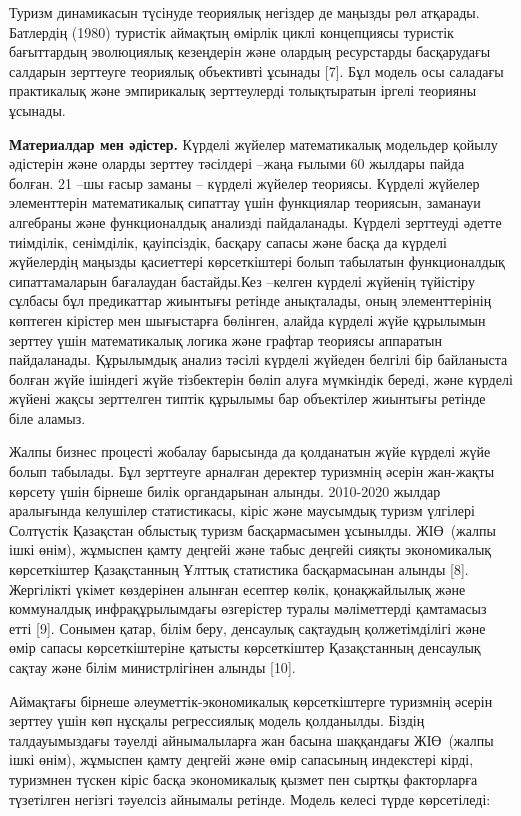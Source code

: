 \begin{multicols}{2}
Туризм динамикасын түсінуде теориялық негіздер де маңызды рөл атқарады.
Батлердің (1980) туристік аймақтың өмірлік циклі концепциясы туристік
бағыттардың эволюциялық кезеңдерін және олардың ресурстарды басқарудағы
салдарын зерттеуге теориялық объективті ұсынады {[}7{]}. Бұл модель осы
саладағы практикалық және эмпирикалық зерттеулерді толықтыратын іргелі
теорияны ұсынады.

{\bfseries Материалдар мен әдістер.} Күрделі жүйелер математикалық
модельдер қойылу әдістерін және оларды зерттеу тәсілдері --жаңа ғылыми
60 жылдары пайда болған. 21 --шы ғасыр заманы -- күрделі жүйелер
теориясы. Күрделі жүйелер элементтерін математикалық сипаттау үшін
функциялар теориясын, заманауи алгебраны және функционалдық анализді
пайдаланады. Күрделі зерттеуді әдетте тиімділік, сенімділік,
қауіпсіздік, басқару сапасы және басқа да күрделі жүйелердің маңызды
қасиеттері көрсеткіштері болып табылатын функционалдық сипаттамаларын
бағалаудан бастайды.Кез --келген күрделі жүйенің түйістіру сұлбасы бұл
предикаттар жиынтығы ретінде анықталады, оның элементтерінің көптеген
кірістер мен шығыстарға бөлінген, алайда күрделі жүйе құрылымын зерттеу
үшін математикалық логика және графтар теориясы аппаратын пайдаланады.
Құрылымдық анализ тәсілі күрделі жүйеден белгілі бір байланыста болған
жүйе ішіндегі жүйе тізбектерін бөліп алуға мүмкіндік береді, және
күрделі жүйені жақсы зерттелген типтік құрылымы бар объектілер жиынтығы
ретінде біле аламыз.

Жалпы бизнес процесті жобалау барысында да қолданатын жүйе күрделі жүйе
болып табылады. Бұл зерттеуге арналған деректер туризмнің әсерін
жан-жақты көрсету үшін бірнеше билік органдарынан алынды. 2010-2020
жылдар аралығында келушілер статистикасы, кіріс және маусымдық туризм
үлгілері Солтүстік Қазақстан облыстық туризм басқармасымен ұсынылды.
ЖІӨ~(жалпы ішкі өнім), жұмыспен қамту деңгейі және табыс деңгейі сияқты
экономикалық көрсеткіштер Қазақстанның Ұлттық статистика басқармасынан
алынды {[}8{]}. Жергілікті үкімет көздерінен алынған есептер көлік,
қонақжайлылық және коммуналдық инфрақұрылымдағы өзгерістер туралы
мәліметтерді қамтамасыз етті {[}9{]}. Сонымен қатар, білім беру,
денсаулық сақтаудың қолжетімділігі және өмір сапасы көрсеткіштеріне
қатысты көрсеткіштер Қазақстанның денсаулық сақтау және білім
министрлігінен алынды {[}10{]}.

Аймақтағы бірнеше әлеуметтік-экономикалық көрсеткіштерге туризмнің
әсерін зерттеу үшін көп нұсқалы регрессиялық модель қолданылды. Біздің
талдауымыздағы тәуелді айнымалыларға жан басына шаққандағы ЖІӨ~(жалпы
ішкі өнім), жұмыспен қамту деңгейі және өмір сапасының индекстері кірді,
туризмнен түскен кіріс басқа экономикалық қызмет пен сыртқы факторларға
түзетілген негізгі тәуелсіз айнымалы ретінде. Модель келесі түрде
көрсетіледі:
\end{multicols}

